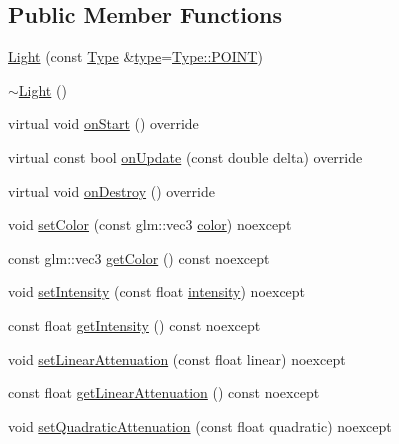 \subsection*{Public Member Functions}
\begin{DoxyCompactItemize}
\item 
\hyperlink{class_graphics_1_1_light_ab15f626fee49a5332eac2f39ac6965f7}{Light} (const \hyperlink{class_graphics_1_1_light_a6c3bc4c73b1bc4a96e0376be4ce0c007}{Type} \&\hyperlink{class_graphics_1_1_light_a91b3331f89b6e025dfecfdc441a7080f}{type}=\hyperlink{class_graphics_1_1_light_a6c3bc4c73b1bc4a96e0376be4ce0c007aaebdbcb765394d25d6a604589a890f82}{Type\+::\+P\+O\+I\+N\+T})
\item 
\hyperlink{class_graphics_1_1_light_ad4ee718e1a005b54db45a660f3aaef00}{$\sim$\+Light} ()
\item 
virtual void \hyperlink{class_graphics_1_1_light_aa8ff320220d375edddae38daec0b3672}{on\+Start} () override
\item 
virtual const bool \hyperlink{class_graphics_1_1_light_ab208fc670894a75038b0e74a75816b21}{on\+Update} (const double delta) override
\item 
virtual void \hyperlink{class_graphics_1_1_light_a7d4ce913fcb79612a90937ae75b3ff2e}{on\+Destroy} () override
\item 
void \hyperlink{class_graphics_1_1_light_aff6f2b957a3a98ca5702ee078938c194}{set\+Color} (const glm\+::vec3 \hyperlink{class_graphics_1_1_light_a903bfd922e53ffe5df769d922928dd0e}{color}) noexcept
\item 
const glm\+::vec3 \hyperlink{class_graphics_1_1_light_a93b2736b7ccef7f7924c367c89a6a4d8}{get\+Color} () const noexcept
\item 
void \hyperlink{class_graphics_1_1_light_a90e92d6c4afa36b9dc8ef67e0b41bd0e}{set\+Intensity} (const float \hyperlink{class_graphics_1_1_light_a539a2fdf9981716b6c57a993262631f6}{intensity}) noexcept
\item 
const float \hyperlink{class_graphics_1_1_light_a5b56e9bd6fe8ddee31141ef867ea3198}{get\+Intensity} () const noexcept
\item 
void \hyperlink{class_graphics_1_1_light_ae0a3cf492daf5a8384474b147b99b540}{set\+Linear\+Attenuation} (const float linear) noexcept
\item 
const float \hyperlink{class_graphics_1_1_light_a2d9ccce40abbe0b728eab317ae7f2e6f}{get\+Linear\+Attenuation} () const noexcept
\item 
void \hyperlink{class_graphics_1_1_light_a6fbc065d5904745297c36e245da080f6}{set\+Quadratic\+Attenuation} (const float quadratic) noexcept

\end{DoxyCompactItemize}
